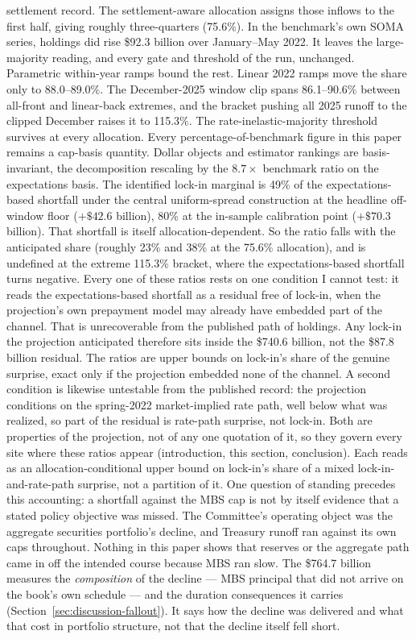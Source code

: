 \documentclass[12pt]{article}
\begin{document}
settlement record. The settlement-aware allocation assigns those inflows to the first half, giving roughly three-quarters (75.6\%). In the benchmark's own SOMA series, holdings did rise \$92.3 billion over January--May 2022. It leaves the large-majority reading, and every gate and threshold of the run, unchanged. Parametric within-year ramps bound the rest. Linear 2022 ramps move the share only to 88.0--89.0\%. The December-2025 window clip spans 86.1--90.6\% between all-front and linear-back extremes, and the bracket pushing all 2025 runoff to the clipped December raises it to 115.3\%. The rate-inelastic-majority threshold survives at every allocation. Every percentage-of-benchmark figure in this paper remains a cap-basis quantity. Dollar objects and estimator rankings are basis-invariant, the decomposition rescaling by the $8.7\times$ benchmark ratio on the expectations basis. The identified lock-in marginal is 49\% of the expectations-based shortfall under the central uniform-spread construction at the headline off-window floor ($+\$42.6$ billion), 80\% at the in-sample calibration point ($+\$70.3$ billion). That shortfall is itself allocation-dependent. So the ratio falls with the anticipated share (roughly 23\% and 38\% at the 75.6\% allocation), and is undefined at the extreme 115.3\% bracket, where the expectations-based shortfall turns negative. Every one of these ratios rests on one condition I cannot test: it reads the expectations-based shortfall as a residual free of lock-in, when the projection's own prepayment model may already have embedded part of the channel. That is unrecoverable from the published path of holdings. Any lock-in the projection anticipated therefore sits inside the \$740.6 billion, not the \$87.8 billion residual. The ratios are upper bounds on lock-in's share of the genuine surprise, exact only if the projection embedded none of the channel. A second condition is likewise untestable from the published record: the projection conditions on the spring-2022 market-implied rate path, well below what was realized, so part of the residual is rate-path surprise, not lock-in. Both are properties of the projection, not of any one quotation of it, so they govern every site where these ratios appear (introduction, this section, conclusion). Each reads as an allocation-conditional upper bound on lock-in's share of a mixed lock-in-and-rate-path surprise, not a partition of it. One question of standing precedes this accounting: a shortfall against the MBS cap is not by itself evidence that a stated policy objective was missed. The Committee's operating object was the aggregate securities portfolio's decline, and Treasury runoff ran against its own caps throughout. Nothing in this paper shows that reserves or the aggregate path came in off the intended course because MBS ran slow. The \$764.7 billion measures the \emph{composition} of the decline --- MBS principal that did not arrive on the book's own schedule --- and the duration consequences it carries (Section~\ref{sec:discussion-fallout}). It says how the decline was delivered and what that cost in portfolio structure, not that the decline itself fell short.
\end{document}
